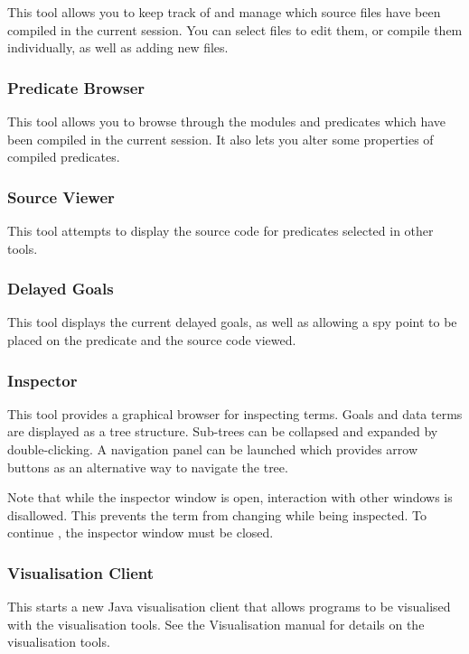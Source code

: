 This tool allows you to keep track of and manage which source files
have been compiled in the current {\eclipse} session.  You can select
files to edit them, or compile them individually, as well as adding
new files.

\subsubsection{Predicate Browser}

This tool allows you to browse through the modules and predicates
which have been compiled in the current session.  It also lets you
alter some properties of compiled predicates.

\subsubsection{Source Viewer}

This tool attempts to display the source code for predicates selected
in other tools.

\subsubsection{Delayed Goals}

This tool displays the current delayed goals, as well as allowing a
spy point to be placed on the predicate and the source code viewed.

\subsubsection{Inspector}

This tool provides a graphical browser for inspecting terms.  Goals
and data terms are displayed as a tree structure.  Sub-trees can be
collapsed and expanded by double-clicking.  A navigation panel can be
launched which provides arrow buttons as an alternative way to
navigate the tree.

Note that while the inspector window is open, interaction with other
{\tkeclipse} windows is disallowed.  This prevents the term from
changing while being inspected.  To continue {\tkeclipse}, the
inspector window must be closed.

\subsubsection{Visualisation Client}

This starts a new Java visualisation client that allows {\eclipse} programs
to be visualised with the visualisation tools. See the Visualisation manual
for details on the visualisation tools.

